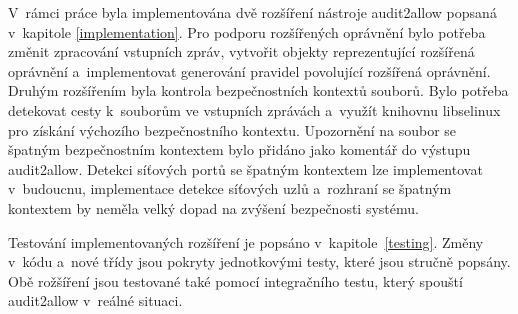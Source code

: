 V~rámci práce byla implementována dvě rozšíření nástroje audit2allow popsaná
v~kapitole \ref{implementation}. Pro podporu rozšířených oprávnění bylo potřeba
změnit zpracování vstupních zpráv, vytvořit objekty reprezentující rozšířená
oprávnění a~implementovat generování pravidel povolující rozšířená oprávnění.
Druhým rozšířením byla kontrola bezpečnostních kontextů souborů. Bylo potřeba
detekovat cesty k~souborům ve vstupních zprávách a~využít knihovnu libselinux
pro získání výchozího bezpečnostního kontextu. Upozornění na soubor se špatným
bezpečnostním kontextem bylo přidáno jako komentář do výstupu audit2allow.
Detekci síťových portů se špatným kontextem lze implementovat v~budoucnu,
implementace detekce síťových uzlů a~rozhraní se špatným kontextem by neměla
velký dopad na zvýšení bezpečnosti systému.

Testování implementovaných rozšíření je popsáno v~kapitole~\ref{testing}. Změny
v~kódu a~nové třídy jsou pokryty jednotkovými testy, které jsou stručně popsány.
Obě rožšíření jsou testované také pomocí integračního testu, který spouští
audit2allow v~reálné situaci.

